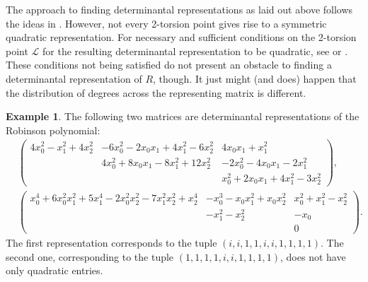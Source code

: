 \documentclass[a4paper,10pt]{amsart}
\theoremstyle{definition}
\newtheorem{ex}[Def]{Example}
\theoremstyle{plain}
\newcommand{\cL}{{\mathcal L}}
\begin{document}
The approach to finding determinantal representations as laid out above follows the ideas in \cite[Theorem B]{beauville}. However, not every 2-torsion point gives rise to a symmetric quadratic representation. For necessary and sufficient conditions on the 2-torsion point $\cL$ for the resulting determinantal representation to be quadratic, see \cite[Theorem 6.2.1]{dolgachev} or \cite[Proposition 3.5]{beauville}. These conditions not being satisfied do not present an obstacle to finding a determinantal representation of $R$, though. It just might (and does) happen that the distribution of degrees across the representing matrix is different.

\begin{ex}
 The following two matrices are determinantal representations of the Robinson polynomial:
 \begin{align*}
      & \begin{pmatrix}
         4x_0^2-x_1^2+4x_2^2 & -6x_0^2-2x_0x_1+4x_1^2-6x_2^2 & 4x_0x_1+x_1^2 \\
         & 4x_0^2+8x_0x_1-8x_1^2+12x_2^2 & -2x_0^2-4x_0x_1-2x_1^2 \\
         & & x_0^2+2x_0x_1+4x_1^2-3x_2^2
     \end{pmatrix}, \\
      & \begin{pmatrix}
         x_0^4+6x_0^2x_1^2+5x_1^4-2x_0^2x_2^2-7x_1^2x_2^2+x_2^4 & -x_0^3-x_0x_1^2+x_0x_2^2 & x_0^2+x_1^2-x_2^2 \\
        & -x_1^2-x_2^2 & -x_0 \\
        & & 0
     \end{pmatrix}.
 \end{align*}
 The first representation corresponds to the tuple $(i,i,1,1,i,i,1,1,1,1)$. The second one, corresponding to the tuple $ (1, 1, 1, 1, i, i, 1, 1, 1, 1)$, does not have only quadratic entries.
\end{ex}
\end{document}
